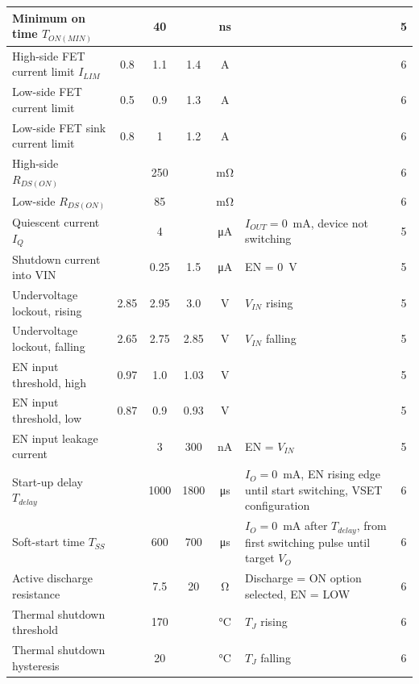 {\begin{longtable}{|L{4.4cm}|c|c|c|c|L{3.6cm}|c|}
\hline
Minimum on time \(T_{ON(MIN)}\) & & \num{40} & & \si{\nano\second} & & 5 \\
\hline
High-side FET current limit \(I_{LIM}\) & \num{0.8} & \num{1.1} & \num{1.4} & \si{\ampere} & & 6 \\
\hline
Low-side FET current limit & \num{0.5} & \num{0.9} & \num{1.3} & \si{\ampere} & & 6 \\
\hline
Low-side FET sink current limit & \num{0.8} & \num{1} & \num{1.2} & \si{\ampere} & & 6 \\
\hline
High-side \(R_{DS(ON)}\) & & \num{250} & & \si{\milli\ohm} & & 6 \\
\hline
Low-side \(R_{DS(ON)}\) & & \num{85} & & \si{\milli\ohm} & & 6 \\
\hline
Quiescent current \(I_Q\) & & \num{4} & & \si{\micro\ampere} & \(I_{OUT}=0\)~mA, device not switching & 5 \\
\hline
Shutdown current into VIN & & \num{0.25} & \num{1.5} & \si{\micro\ampere} & EN = 0~V & 5 \\
\hline
Undervoltage lockout, rising & \num{2.85} & \num{2.95} & \num{3.0} & \si{\volt} & \(V_{IN}\) rising & 5 \\
\hline
Undervoltage lockout, falling & \num{2.65} & \num{2.75} & \num{2.85} & \si{\volt} & \(V_{IN}\) falling & 5 \\
\hline
EN input threshold, high & \num{0.97} & \num{1.0} & \num{1.03} & \si{\volt} & & 5 \\
\hline
EN input threshold, low & \num{0.87} & \num{0.9} & \num{0.93} & \si{\volt} & & 5 \\
\hline
EN input leakage current & & \num{3} & \num{300} & \si{\nano\ampere} & EN = \(V_{IN}\) & 5 \\
\hline
Start-up delay \(T_{delay}\) & & \num{1000} & \num{1800} & \si{\micro\second} & \(I_O=0\)~mA, EN rising edge until start switching, VSET configuration & 6 \\
\hline
Soft-start time \(T_{SS}\) & & \num{600} & \num{700} & \si{\micro\second} & \(I_O=0\)~mA after \(T_{delay}\), from first switching pulse until target \(V_O\) & 6 \\
\hline
Active discharge resistance & & \num{7.5} & \num{20} & \si{\ohm} & Discharge = ON option selected, EN = LOW & 6 \\
\hline
Thermal shutdown threshold & & \num{170} & & \si{\celsius} & \(T_J\) rising & 6 \\
\hline
Thermal shutdown hysteresis & & \num{20} & & \si{\celsius} & \(T_J\) falling & 6 \\

\end{longtable}}
